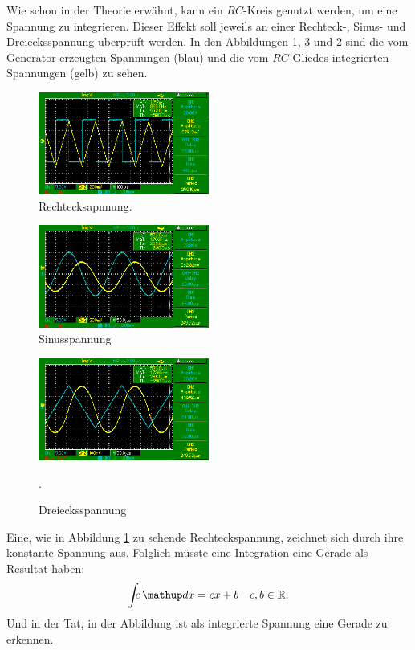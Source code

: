 Wie schon in der Theorie erwähnt, kann ein $RC$-Kreis genutzt werden, um eine
Spannung zu integrieren.
Dieser Effekt soll jeweils an einer Rechteck-, Sinus- und Dreiecksspannung %
überprüft werden.
In den Abbildungen \ref{fig:rechteck}, \ref{fig:dreieck} und \ref{fig:sinus} sind die vom
Generator erzeugten Spannungen (blau) und die vom $RC$-Gliedes integrierten Spannungen
(gelb) zu sehen. %
\FloatBarrier
\begin{figure}
  \centering
  \includegraphics[width=0.5\textwidth]{pics/teild_rechteckspannung.png}
  \caption{Rechtecksapnnung.}
  \label{fig:rechteck}
\end{figure}
\begin{figure}
  \centering
  \includegraphics[width=0.5\textwidth]{pics/bildd_sinus.png}
  \caption{Sinusspannung}
  \label{fig:sinus}
\end{figure}
\begin{figure}
  \centering
  \includegraphics[width=0.5\textwidth]{pics/teild_dreieck.png}
  \caption{Dreiecksspannung}.
  \label{fig:dreieck}
\end{figure}
\FloatBarrier
Eine, wie in Abbildung \ref{fig:rechteck} zu sehende Rechteckspannung, %
zeichnet sich durch ihre konstante Spannung aus. Folglich müsste eine Integration
eine Gerade als Resultat haben: %
\begin{equation*}
   \int\!\!\!c \dv{x}= cx+b \quad c,b\in\mathbb{R}.
\end{equation*}
Und in der Tat, in der Abbildung ist als integrierte Spannung eine Gerade zu erkennen. %

